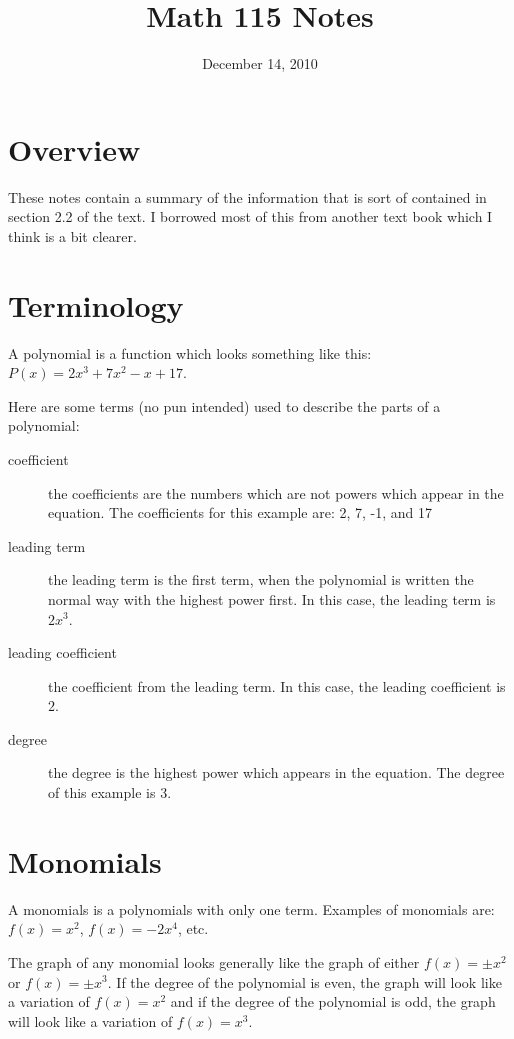 \documentclass[fleqn,addpoints]{exam}
\title{Math 115 Notes}
\date{December 14, 2010}
\begin{document}
\maketitle
 
\section{Overview}

These notes contain a summary of the information that is sort of contained in section 2.2 of the text.  I borrowed
most of this from another text book which I think is a bit clearer.

\section{Terminology}
A polynomial is a function which looks something like this: $P(x) = 2x^3 + 7x^2 - x + 17$.

Here are some terms (no pun intended) used to describe the parts of a polynomial:

\begin{description}

\item[coefficient] the coefficients are the numbers which are not powers which appear in the equation.  The coefficients
  for this example are: 2, 7, -1, and 17 

\item[leading term] the leading term is the first term, when the polynomial is written the normal way with the highest
  power first.  In this case, the leading term is $2x^3$.

\item[leading coefficient] the coefficient from the leading term.  In this case, the leading coefficient is $2$.

\item[degree] the degree is the highest power which appears in the equation.  The degree of this example is 3.

\end{description}

\section{Monomials}
A monomials is a polynomials with only one term.  Examples of monomials are: $f(x) = x^2$, $f(x) = -2x^4$, etc.  

The graph of any monomial looks generally like the graph of either $f(x) = \pm x^2$ or $f(x) = \pm x^3$.  If the degree
of the polynomial is even, the graph will look like a variation of $f(x) = x^2$ and if the degree of the polynomial is
odd, the graph will look like a variation of $f(x) = x^3$.
\end{document}
